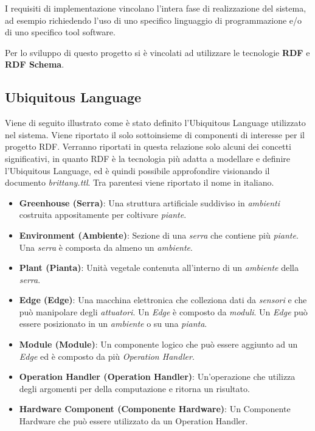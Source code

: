 I requisiti di implementazione vincolano l’intera fase di realizzazione del sistema, ad esempio richiedendo l’uso di uno specifico linguaggio di programmazione e/o di uno specifico tool software.

\noindent Per lo sviluppo di questo progetto si è vincolati ad utilizzare le tecnologie \textbf{RDF} e \textbf{RDF Schema}.

\subsection{Ubiquitous Language}
Viene di seguito illustrato come è stato definito l’Ubiquitous Language utilizzato nel sistema. Viene riportato il solo sottoinsieme di componenti di interesse per il progetto RDF. Verranno riportati in questa relazione solo alcuni dei concetti significativi, in quanto RDF è la tecnologia più adatta a modellare e definire l'Ubiquitous Language, ed è quindi possibile approfondire visionando il documento \textit{brittany.ttl}. Tra parentesi viene riportato il nome in italiano.

\begin{itemize}
	\item \textbf{Greenhouse (Serra)}: Una struttura artificiale suddiviso in \textit{ambienti} costruita appositamente per coltivare \textit{piante}.
	\item \textbf{Environment (Ambiente)}: Sezione di una \textit{serra} che contiene più \textit{piante}. Una \textit{serra} è composta da almeno un \textit{ambiente}.
	\item \textbf{Plant (Pianta)}: Unità vegetale contenuta all’interno di un \textit{ambiente} della \textit{serra}.
	\item \textbf{Edge (Edge)}: Una macchina elettronica che colleziona dati da \textit{sensori} e che può manipolare degli \textit{attuatori}. Un \textit{Edge} è composto da \textit{moduli}. Un \textit{Edge} può essere posizionato in un \textit{ambiente} o su una \textit{pianta}.
	\item \textbf{Module (Module)}: Un componente logico che può essere aggiunto ad un \textit{Edge} ed è composto da più \textit{Operation Handler}.
	\item \textbf{Operation Handler (Operation Handler)}: Un'operazione che utilizza degli argomenti per della computazione e ritorna un risultato.
	\item \textbf{Hardware Component (Componente Hardware)}: Un Componente Hardware che può essere utilizzato da un Operation Handler.
\end{itemize}
